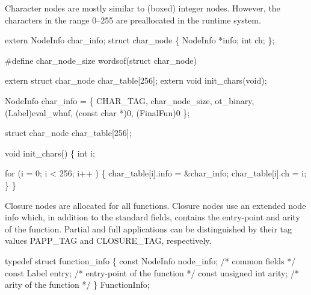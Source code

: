 \nwendcode{}\nwdocspar
Character nodes are mostly similar to (boxed) integer nodes. However,
the characters in the range 0--255 are preallocated in the runtime
system.

\nwenddocs{}\plusendmoddef\nwstartdeflinemarkup{}\nwenddeflinemarkup
extern NodeInfo char_info;
struct char_node \{
    NodeInfo *info;
    int ch;
\};

#define char_node_size          wordsof(struct char_node)

extern struct char_node char_table[256];
extern void init_chars(void);

\nwendcode{}\plusendmoddef\nwstartdeflinemarkup{}\nwenddeflinemarkup
NodeInfo char_info = \{
    CHAR_TAG, char_node_size, ot_binary, (Label)eval_whnf, (const char *)0,
    (FinalFun)0
\};

struct char_node char_table[256];

void
init_chars()
\{
    int i;

    for (i = 0; i < 256; i++ )
    \{
        char_table[i].info = &char_info;
        char_table[i].ch = i;
    \}
\}

\nwendcode{}\nwdocspar
Closure nodes are allocated for all functions. Closure nodes use an
extended node info which, in addition to the standard fields, contains
the entry-point and arity of the function. Partial and full
applications can be distinguished by their tag values {\Tt{}PAPP{\_}TAG\nwendquote} and
{\Tt{}CLOSURE{\_}TAG\nwendquote}, respectively.

\nwenddocs{}\plusendmoddef\nwstartdeflinemarkup{}\nwenddeflinemarkup
typedef struct function_info \{
    const NodeInfo     node_info;       /* common fields */
    const Label        entry;           /* entry-point of the function */
    const unsigned int arity;           /* arity of the function */
\} FunctionInfo;

